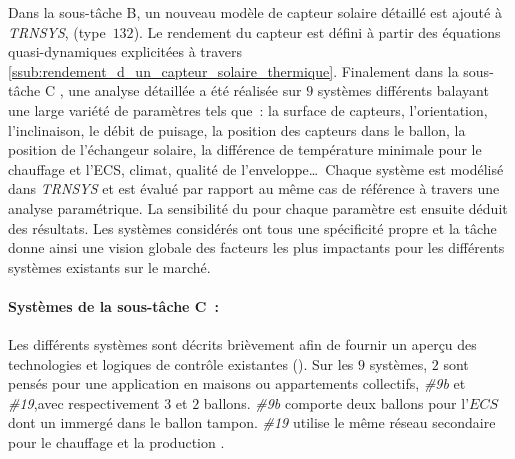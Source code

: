 Dans la sous-tâche B, un nouveau modèle de capteur solaire détaillé est ajouté à
\textit{TRNSYS}, (type~$132$). Le rendement du capteur est défini à partir des équations
quasi-dynamiques explicitées à travers \ref{ssub:rendement_d_un_capteur_solaire_thermique}.
Finalement dans la sous-tâche C \parencite{Task26C2007}, une analyse détaillée a été
réalisée sur $9$ systèmes différents balayant une large variété de paramètres tels que~:
la surface de capteurs, l’orientation, l’inclinaison, le débit de puisage, la position des
capteurs dans le ballon, la position de l’échangeur solaire, la différence de température
minimale pour le chauffage et l’ECS, climat, qualité de l’enveloppe\dots\ Chaque système
est modélisé dans \textit{TRNSYS} et est évalué par rapport au même cas de référence à
travers une analyse paramétrique. La sensibilité du  pour chaque paramètre est
ensuite déduit des résultats. Les systèmes considérés ont tous une spécificité propre et
la tâche donne ainsi une vision globale des facteurs les plus impactants pour les
différents systèmes existants sur le marché.

\paragraph{Systèmes de la sous-tâche C~:} %
\label{par:systemes_de_la_sous_tache_c}
Les différents systèmes sont décrits brièvement afin de fournir un aperçu des
technologies et logiques de contrôle existantes ().
Sur les $9$ systèmes, $2$ sont pensés pour une application en maisons ou appartements
collectifs, \emph{\#9b} et \emph{\#19},avec respectivement $3$ et $2$ ballons.
\emph{\#9b} comporte deux ballons pour l’$ECS$ dont un immergé
dans le ballon tampon. \emph{\#19} utilise le même réseau secondaire pour le chauffage
et la production .

